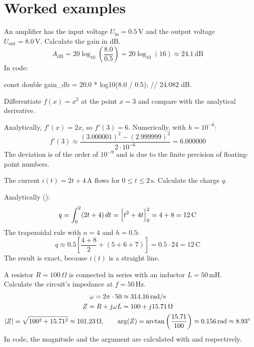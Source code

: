 \section{Worked examples}
\label{c18:sec:typexempel}

\begin{exempel}
An amplifier has the input voltage $U_{\text{in}} = 0.5\,\text{V}$ and the output voltage
$U_{\text{out}} = 8.0\,\text{V}$. Calculate the gain in dB.
\[
  A_{\text{dB}} = 20\log_{10}\left(\frac{8.0}{0.5}\right) = 20\log_{10}(16) \approx
  24.1\,\text{dB}
\]
In code:

\begin{ccode}
const double gain_db = 20.0 * log10(8.0 / 0.5); // 24.082 dB.
\end{ccode}
\end{exempel}

\begin{exempel}
Differentiate $f(x) = x^2$ at the point $x = 3$ and compare with the analytical derivative.

Analytically, $f'(x) = 2x$, so $f'(3) = 6$. Numerically, with $h = 10^{-6}$:
\[
  f'(3) \approx \frac{(3.000001)^2 - (2.999999)^2}{2 \cdot 10^{-6}} = 6.000000
\]
The deviation is of the order of $10^{-9}$ and is due to the finite precision of floating-point
numbers.
\end{exempel}

\begin{exempel}
The current $i(t) = 2t + 4\,\text{A}$ flows for $0 \leq t \leq 2\,\text{s}$. Calculate the charge
$q$.

Analytically ():
\[
  q = \int_0^2 (2t + 4)\,dt = \Bigl[t^2 + 4t\Bigr]_0^2 = 4 + 8 = 12\,\text{C}
\]
The trapezoidal rule with $n = 4$ and $h = 0.5$:
\[
  q \approx 0.5\left[\frac{4 + 8}{2} + (5 + 6 + 7)\right] = 0.5 \cdot 24 = 12\,\text{C}
\]
The result is exact, because $i(t)$ is a straight line.
\end{exempel}

\begin{exempel}
A resistor $R = 100\,\Omega$ is connected in series with an inductor $L = 50\,\text{mH}$.
Calculate the circuit's impedance at $f = 50\,\text{Hz}$.
\begin{gather*}
  \omega = 2\pi \cdot 50 \approx 314.16\,\text{rad/s} \\
  Z = R + j\omega L = 100 + j15.71\,\Omega \\
  \lvert Z\rvert = \sqrt{100^2 + 15.71^2} \approx 101.23\,\Omega, \qquad
  \arg(Z) = \arctan\left(\frac{15.71}{100}\right) \approx 0.156\,\text{rad} \approx
  8.93^{\circ}
\end{gather*}
In code, the magnitude and the argument are calculated with  and
 respectively.
\end{exempel}

